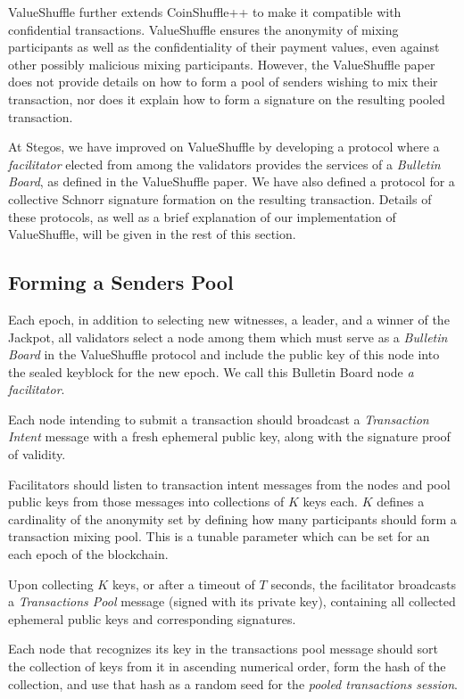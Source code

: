 \documentclass[a4paper, 10pt, conference]{ieeeconf}
\begin{document}
ValueShuffle\cite{c19} further extends CoinShuffle++ to make it compatible with confidential transactions. ValueShuffle ensures the anonymity of mixing participants as well as the confidentiality of their payment values, even against other possibly malicious mixing participants. However, the ValueShuffle paper does not provide details on how to form a pool of senders wishing to mix their transaction, nor does it explain how to form a signature on the resulting pooled transaction. 

At Stegos, we have improved on ValueShuffle by developing a protocol where a \textit{facilitator} elected from among the validators provides the services of a \textit{Bulletin Board}, as defined in the ValueShuffle paper. We have also defined a protocol for a collective Schnorr signature\cite{c22} formation on the resulting transaction. Details of these protocols, as well as a brief explanation of our implementation of ValueShuffle, will be given in the rest of this section.

\subsection{Forming a Senders Pool}
Each epoch, in addition to selecting new witnesses, a leader, and a winner of the Jackpot, all validators select a node among them which must serve as a \textit{Bulletin Board} in the ValueShuffle protocol and include the public key of this node into the sealed keyblock for the new epoch. We call this Bulletin Board node \textit{a facilitator}.

Each node intending to submit a transaction should broadcast a \textit{Transaction Intent} message with a fresh ephemeral public key, along with the signature proof of validity.

Facilitators should listen to transaction intent messages from the nodes and pool public keys from those messages into collections of $K$ keys each. $K$ defines a cardinality of the anonymity set by defining how many participants should form a transaction mixing pool. This is a tunable parameter which can be set for an each epoch of the blockchain. 

Upon collecting $K$ keys, or after a timeout of $T$ seconds, the facilitator broadcasts a \textit{Transactions Pool} message (signed with its private key), containing all collected ephemeral public keys and corresponding signatures.

Each node that recognizes its key in the transactions pool message should sort the collection of keys from it in ascending numerical order, form the hash of the collection, and use that hash as a random seed for the \textit{pooled transactions session}.
\end{document}
